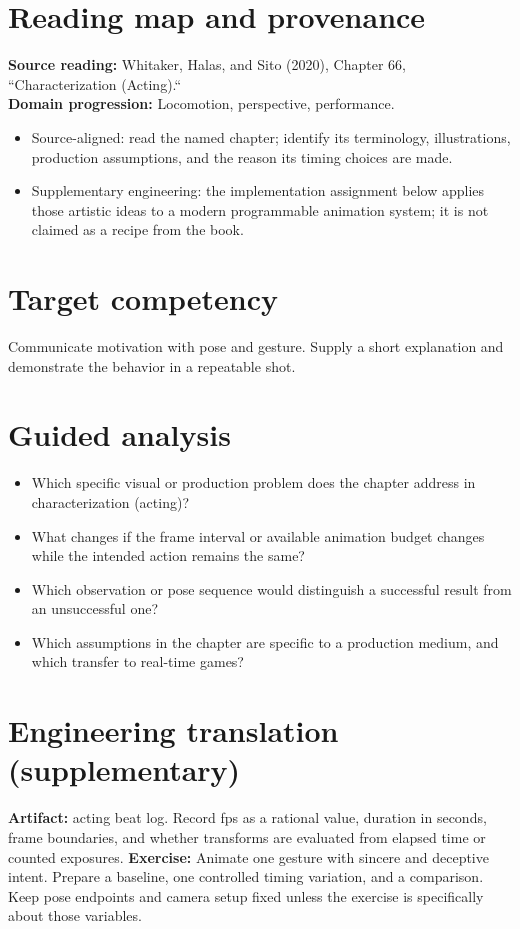 \documentclass[10pt,letterpaper]{article}
\begin{document}
\makedoctitle
\makedocsummary

\section{Reading map and provenance}
\textbf{Source reading:} Whitaker, Halas, and Sito (2020), Chapter 66, ``Characterization (Acting).``\\
\textbf{Domain progression:} Locomotion, perspective, performance.
\begin{itemize}
\item Source-aligned: read the named chapter; identify its terminology, illustrations, production assumptions, and the reason its timing choices are made.
\item Supplementary engineering: the implementation assignment below applies those artistic ideas to a modern programmable animation system; it is not claimed as a recipe from the book.
\end{itemize}
\section{Target competency}
Communicate motivation with pose and gesture. Supply a short explanation and demonstrate the behavior in a repeatable shot.
\section{Guided analysis}
\begin{itemize}
\item Which specific visual or production problem does the chapter address in characterization (acting)?
\item What changes if the frame interval or available animation budget changes while the intended action remains the same?
\item Which observation or pose sequence would distinguish a successful result from an unsuccessful one?
\item Which assumptions in the chapter are specific to a production medium, and which transfer to real-time games?
\end{itemize}
\section{Engineering translation (supplementary)}
\textbf{Artifact:} acting beat log. Record fps as a rational value, duration in seconds, frame boundaries, and whether transforms are evaluated from elapsed time or counted exposures.
\textbf{Exercise:} Animate one gesture with sincere and deceptive intent. Prepare a baseline, one controlled timing variation, and a comparison. Keep pose endpoints and camera setup fixed unless the exercise is specifically about those variables.
\end{document}
